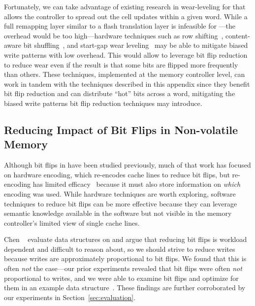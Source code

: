 Fortunately, we can take advantage of existing research in wear-leveling for \NVM that allows
the controller to spread out the cell updates within a given word.
While a full remapping layer similar to a flash translation layer is infeasible
for \NVM---the overhead would be too high---hardware techniques such as row
shifting~\cite{zhou:isca09:fixed}, content-aware bit shuffling~\cite{Han:cabs}, and
start-gap wear leveling~\cite{qureshi:micro09} may be able to mitigate biased
write patterns with low overhead. This would allow \NVM to leverage bit flip
reduction to reduce wear even if the result is that some bits are flipped more
frequently than others.  These techniques, implemented at the memory
controller level, can work in tandem with the techniques described in this appendix since they benefit
bit flip reduction and can distribute ``hot'' bits across a word, mitigating the biased write
patterns bit flip reduction techniques may introduce.


\subsection{Reducing Impact of Bit Flips in Non-volatile Memory}

Although bit flips in \NVM have been studied previously, much of that work has
focused on hardware encoding, which re-encodes cache lines to reduce bit flips,
but re-encoding has limited efficacy~\cite{flipnwrite,
	jacobvitz2013coset, seyedzadeh2016coset} because it must also store information
on \textit{which} encoding was used. While hardware techniques are worth
exploring, software techniques to reduce bit flips can be more effective because
they can leverage semantic knowledge available in the software but not
visible in the memory controller's limited view of single cache lines.

Chen \etal~\cite{Chen_rethinkingdatabase} evaluate data structures on \NVM and
argue that reducing bit flips is workload dependent and difficult to reason
about, so we should strive to reduce writes because writes are approximately
proportional to bit flips. We found that this is often \emph{not} the case---our prior experiments
revealed that bit flips were often \emph{not} proportional to writes, and we were able to
examine bit flips and optimize for them in an example data structure~\cite{bittman:nvmsa18}. These findings are further
corroborated by our experiments in Section~\ref{sec:evaluation}.

